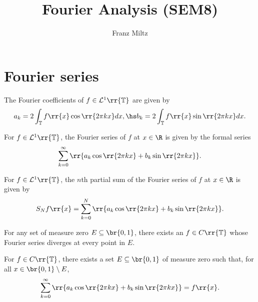\documentclass{article}
\begin{document}
\mkthmstwounified
\title{Fourier Analysis (SEM8)}
\author{Franz Miltz}
\maketitle
\tableofcontents
\pagebreak

\section{Fourier series}

\begin{definition}
  The Fourier coefficients of $f\in\mathcal L^1\rr{\mathbb T}$ are given by
  \begin{align*}
    a_k = 2\int_{\mathbb T} f\rr{x}\cos\rr{2\pi kx}dx,\hs
    b_k = 2\int_{\mathbb T} f\rr{x}\sin\rr{2\pi kx}dx.
  \end{align*}
\end{definition}

\begin{definition}
  For $f\in\mathcal L^1\rr{\mathbb T}$, the Fourier series of $f$ at $x\in\R$ is
  given by the formal series
  \begin{align*}
    \sum_{k=0}^\infty \rr{a_k\cos\rr{2\pi kx}+b_k\sin\rr{2\pi kx}}.
  \end{align*}
\end{definition}

\begin{definition}
  For $f\in\mathcal L^1\rr{\mathbb T}$, the $n$th partial sum of the Fourier series
  of $f$ at $x\in\R$ is given by
  \begin{align*}
    S_N f\rr{x} = \sum_{k=0}^N \rr{a_k\cos\rr{2\pi k x} + b_k\sin\rr{2\pi k x}}.
  \end{align*}
\end{definition}

\begin{theorem}[Katznelson]
  For any set of measure zero $E\subseteq\br{0,1}$, there exists an $f\in C\rr{\mathbb T}$
  whose Fourier series diverges at every point in $E$.
\end{theorem}

\begin{theorem}[Carleson]
  For $f\in C\rr{\mathbb T}$, there exists a set $E\subseteq\br{0,1}$ of measure zero
  such that, for all $x\in \br{0,1}\setminus E$,
  \begin{align*}
    \sum_{k=0}^\infty \rr{a_k\cos\rr{2\pi k x} + b_k\sin\rr{2\pi k x}} = f\rr{x}.
  \end{align*}
\end{theorem}
\end{document}
